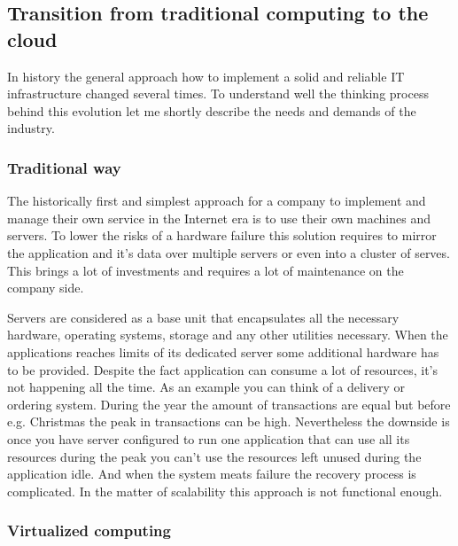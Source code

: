 \subsection{Transition from traditional computing to the cloud}
\label{sub:Transition from traditional computing to the cloud}

In history the general approach how to implement a solid and reliable IT infrastructure changed several times. To understand well the thinking process behind this evolution let me shortly describe the needs and demands of the industry.

\subsubsection{Traditional way}
\label{subs:Traditional way}

The historically first and simplest approach for a company to implement and manage their own service in the Internet era is to use their own machines and servers. To lower the risks of a hardware failure this solution requires to mirror the application and it's data over multiple servers or even into a cluster of serves. This brings a lot of investments and requires a lot of maintenance on the company side.

Servers are considered as a base unit that encapsulates all the necessary hardware, operating systems, storage and any other utilities necessary. When the applications reaches limits of its dedicated server some additional hardware has to be provided. Despite the fact application can consume a lot of resources, it's not happening all the time. As an example you can think of a delivery or ordering system. During the year the amount of transactions are equal but before e.g. Christmas the peak in transactions can be high. Nevertheless the downside is once you have server configured to run one application that can use all its resources during the peak you can't use the resources left unused during the application idle. And when the system meats failure the recovery process is complicated. In the matter of scalability this approach is not functional enough.

\subsubsection{Virtualized computing}
\label{subs:Virtualized computing}

